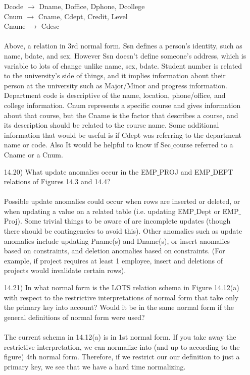 \documentclass[12pt]{article}
\begin{document}
\begin{enumerate}
		Dcode $\rightarrow$ Dname, Doffice, Dphone, Dcollege\\
		Cnum $\rightarrow$ Cname, Cdept, Credit, Level\\
		Cname $\rightarrow$ Cdesc \\ \\
		Above, a relation in 3rd normal form. Ssn defines a person's identity, such as name, bdate, and sex. However Ssn doesn't define someone's address, which is variable to lots of change unlike name, sex, bdate. Student number is related to the university's side of things, and it implies information about their person at the university such as Major/Minor and progress information. Department code is descriptive of the name, location, phone/office, and college information. Cnum represents a specific course and gives information about that course, but the Cname is the factor that describes a course, and its description should be related to the course name. Some additional information that would be useful is if Cdept was referring to the department name or code. Also It would be helpful to know if Sec$\_$course referred to a Cname or a Cnum. \\
		
	\item[14.20)] What update anomalies occur in the EMP$\_$PROJ and EMP$\_$DEPT relations of Figures 14.3 and 14.4? \\ \\
	Possible update anomalies could occur when rows are inserted or deleted, or when updating a value on a related table (i.e. updating EMP$\_$Dept or EMP$\_$Proj). Some trivial things to be aware of are incomplete updates (though there should be contingencies to avoid this). Other anomalies such as update anomalies include updating Pname(s) and Dname(s), or insert anomalies based on constraints, and deletion anomalies based on constraints. (For example, if project requires at least 1 employee, insert and deletions of projects would invalidate certain rows). \\
	
	\item[14.21)]  In what normal form is the LOTS relation schema in Figure 14.12(a) with respect to the restrictive interpretations of normal form that take only the primary key into account? Would it be in the same normal form if the general definitions of normal form were used? \\ \\
	The current schema in 14.12(a) is in 1st normal form. If you take away the restrictive interpretation, we can normalize into (and up to according to the figure) 4th normal form. Therefore, if we restrict our our definition to just a primary key, we see that we have a hard time normalizing.
	\pagebreak
	

\end{enumerate}
\end{document}
